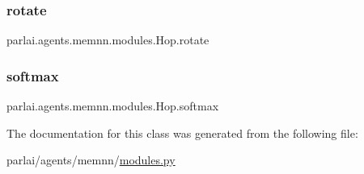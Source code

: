 \subsubsection{\texorpdfstring{rotate}{rotate}}
{\footnotesize\ttfamily parlai.\+agents.\+memnn.\+modules.\+Hop.\+rotate}

\mbox{\label{classparlai_1_1agents_1_1memnn_1_1modules_1_1Hop_a50d4a5a4bd188efc2944d68c0761cc0a}} 
\subsubsection{\texorpdfstring{softmax}{softmax}}
{\footnotesize\ttfamily parlai.\+agents.\+memnn.\+modules.\+Hop.\+softmax}



The documentation for this class was generated from the following file\+:\begin{DoxyCompactItemize}
\item 
parlai/agents/memnn/\hyperlink{parlai_2agents_2memnn_2modules_8py}{modules.\+py}\end{DoxyCompactItemize}
